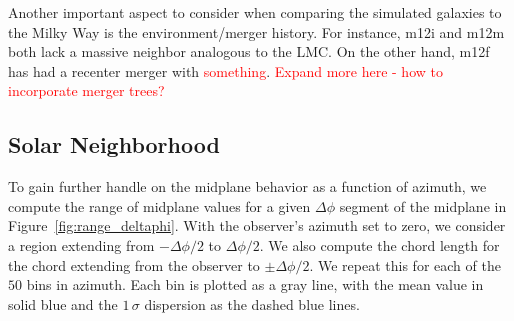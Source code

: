 \documentclass[twocolumn]{aastex62}
\newcommand{\Gus}[1]{\textcolor{red}{#1}}
\begin{document}
Another important aspect to consider when comparing the simulated galaxies to
the Milky Way is the environment/merger history. For instance, m12i and m12m
both lack a massive neighbor analogous to the LMC. On the other hand, m12f has
had a recenter merger with \Gus{something}. \Gus{Expand more here - how to
incorporate merger trees?}

\subsection{Solar Neighborhood} \label{ssec:neighborhood}
To gain further handle on the midplane behavior as a function of azimuth, we
compute the range of midplane values for a given $\Delta \phi$ segment of the
midplane in Figure~\ref{fig:range_deltaphi}. With the observer's azimuth set
to zero, we consider a region extending from $-\Delta \phi/2$ to
$\Delta\phi/2$. We also compute the chord length for the chord extending from
the observer to $\pm \Delta\phi/2$. We repeat this for each of the $50$ bins
in azimuth. Each bin is plotted as a gray line, with the mean value in solid
blue and the $1\,\sigma$ dispersion as the dashed blue lines.

\begin{figure*}
\caption{A cartoon explanation of Figure~\ref{fig:range_deltaphi}. An observer
is placed at the blue x in the plane of a backgrround galaxy (lime). For a
given $\Delta \phi$ (blue) centered on the observer, we record the range of
midplane values for this section of the Solar circle (orange). We plot the
value of the range against the value of $\Delta \phi$. We are also able to
convert the value of $\Delta \phi$ into a chord length (pink), which we plot
as a secondary, upper $x$-axis. We repeat the procedure for each initial
$\phi$ (gray lines), and also compute the mean and $\pm1\,\sigma$ values (dark
blue).}
\label{fig:fig_to_explain}
\end{figure*}

\begin{figure*}
\caption{The range of midplane heights encountered as a function of angular
width. At each angle $\phi$ from Figure~\ref{fig:midplane} we consider an
angular width of $\Delta \phi$ centered on $\phi$ and report the range of
midplane heights within that width. We repeat the procedure for each $\phi$
and plot the result as translucent gray lines. We also plot the mean range as
a solid blue line and the $\pm1\sigma$ lines as dashed blue lines. The upper
$x$-axis shows the chord length from the position $\phi$ to $\pm\Delta\phi/2$.
A cartoon explanation of this Figure is given in
Figure~\ref{fig:fig_to_explain}.}
\label{fig:range_deltaphi}
\end{figure*}
\end{document}
